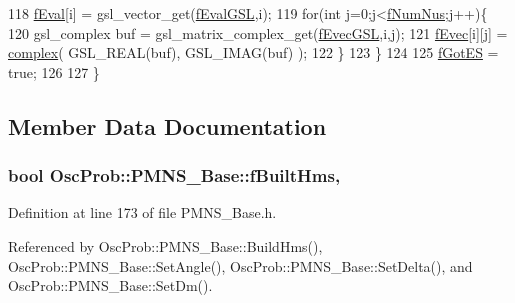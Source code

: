 \begin{DoxyCode}
118     \hyperlink{classOscProb_1_1PMNS__Base_a6319c34d7decbb9d7d6da279c06e8c2d}{fEval}[i] = gsl\_vector\_get(\hyperlink{classOscProb_1_1PMNS__Sterile_abdcb0a144aadef0239dfb36ed4ed0297}{fEvalGSL},i);
119     \textcolor{keywordflow}{for}(\textcolor{keywordtype}{int} j=0;j<\hyperlink{classOscProb_1_1PMNS__Base_a24bb74bed63569dfe88b18fa6a08060e}{fNumNus};j++)\{
120       gsl\_complex buf = gsl\_matrix\_complex\_get(\hyperlink{classOscProb_1_1PMNS__Sterile_a8ab71bc7de328eb6ba855904f365fb1d}{fEvecGSL},i,j);
121       \hyperlink{classOscProb_1_1PMNS__Base_a093e7bd31d4ef52ed52df414e12c1d17}{fEvec}[i][j] = \hyperlink{classOscProb_1_1PMNS__Base_ae86ec4718808ce9d02e5f5b4226714ab}{complex}( GSL\_REAL(buf), GSL\_IMAG(buf) );
122     \}
123   \}
124   
125   \hyperlink{classOscProb_1_1PMNS__Base_a6dc5cd010d2d70b2324745b4e53e9839}{fGotES} = \textcolor{keyword}{true};
126   
127 \}
\end{DoxyCode}


\subsection{Member Data Documentation}
\subsubsection[{\texorpdfstring{f\+Built\+Hms}{fBuiltHms}}]{\setlength{\rightskip}{0pt plus 5cm}bool Osc\+Prob\+::\+P\+M\+N\+S\+\_\+\+Base\+::f\+Built\+Hms\hspace{0.3cm}{\ttfamily [protected]}, {\ttfamily [inherited]}}\hypertarget{classOscProb_1_1PMNS__Base_a9ac3cadeac8db1b90f3152f476244780}{}\label{classOscProb_1_1PMNS__Base_a9ac3cadeac8db1b90f3152f476244780}


Definition at line 173 of file P\+M\+N\+S\+\_\+\+Base.\+h.



Referenced by Osc\+Prob\+::\+P\+M\+N\+S\+\_\+\+Base\+::\+Build\+Hms(), Osc\+Prob\+::\+P\+M\+N\+S\+\_\+\+Base\+::\+Set\+Angle(), Osc\+Prob\+::\+P\+M\+N\+S\+\_\+\+Base\+::\+Set\+Delta(), and Osc\+Prob\+::\+P\+M\+N\+S\+\_\+\+Base\+::\+Set\+Dm().

